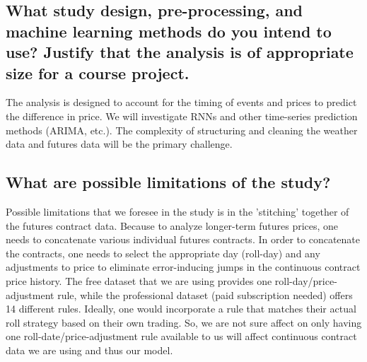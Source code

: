 \documentclass[twoside,11pt]{article}
\begin{document}
\subsection{What study design, pre-processing, and machine learning methods do you intend to use? Justify that the analysis is of appropriate size for a course project.}

The analysis is designed to account for the timing of events and prices to predict the difference in price. We will investigate RNNs and other time-series prediction methods (ARIMA, etc.). The complexity of structuring and cleaning the weather data and futures data will be the primary challenge.

\subsection{What are possible limitations of the study?}

Possible limitations that we foresee in the study is in the 'stitching' together of the futures contract data.  Because to analyze longer-term futures prices, one needs to concatenate various individual futures contracts.  In order to concatenate the contracts, one needs to select the appropriate day (roll-day) and any adjustments to price to eliminate error-inducing jumps in the continuous contract price history.  The free dataset that we are using provides one roll-day/price-adjustment rule, while the professional dataset (paid subscription needed) offers 14 different rules.  Ideally, one would incorporate a rule that matches their actual roll strategy based on their own trading.  So, we are not sure affect on only having one roll-date/price-adjustment rule available to us will affect continuous contract data we are using and thus our model.  





\end{document}
